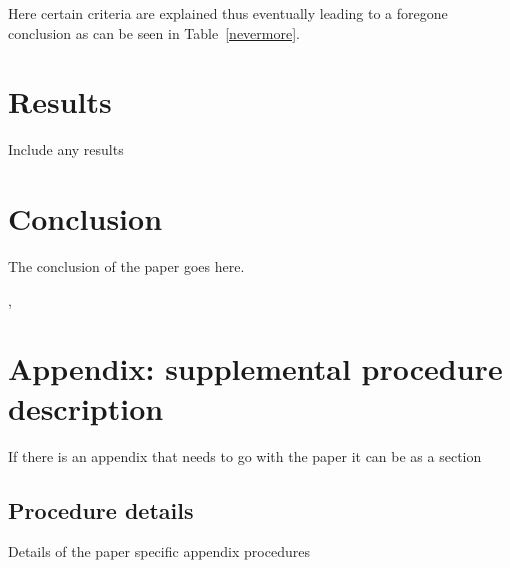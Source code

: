 Here certain criteria are explained thus eventually
leading to a foregone conclusion as can be seen in
Table~\ref{nevermore}.

\begin{table}[h!tb] \centering
\setlength{\captionwidth}{3.5 in}
\label{nevermore}

\vspace{ 2 in}
\end{table}

\section{Results}
Include any results

\section{Conclusion}\label{conclusion2}

The conclusion of the paper goes here.

\cite{Rea85}
\cite{Enf87}, \cite{Dau75} 
\cite{KPS75}

\section{Appendix: supplemental procedure description}
If there is an appendix that needs to go with the paper it can be as a section

\subsection{Procedure details}
Details of the paper specific appendix procedures



\begingroup
    \setlength{\bibsep}{13.2pt}
    \linespread{1}\selectfont
    
\endgroup
\clearpage
\pagebreak